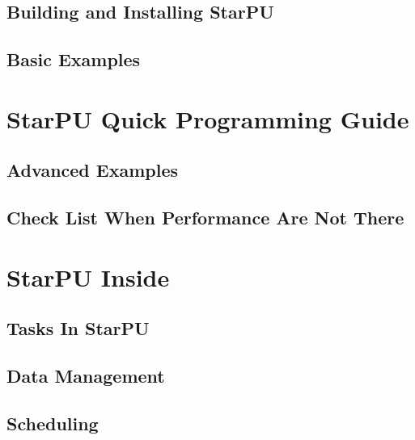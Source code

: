 \chapter{Building and Installing StarPU}
\label{BuildingAndInstallingStarPU}
\hypertarget{BuildingAndInstallingStarPU}{}


\chapter{Basic Examples}
\label{BasicExamples}
\hypertarget{BasicExamples}{}


\part{StarPU Quick Programming Guide}

\chapter{Advanced Examples}
\label{AdvancedExamples}
\hypertarget{AdvancedExamples}{}


\chapter{Check List When Performance Are Not There}
\label{CheckListWhenPerformanceAreNotThere}
\hypertarget{CheckListWhenPerformanceAreNotThere}{}


\part{StarPU Inside}

\chapter{Tasks In StarPU}
\label{TasksInStarPU}
\hypertarget{TasksInStarPU}{}


\chapter{Data Management}
\label{DataManagement}
\hypertarget{DataManagement}{}


\chapter{Scheduling}
\label{Scheduling}
\hypertarget{Scheduling}{}


